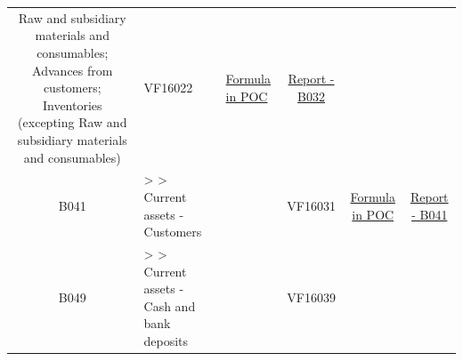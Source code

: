 \documentclass[]{book}
\begin{document}
\begin{longtable}[]{@{}cllccc@{}}
\begin{minipage}[t]{0.16\columnwidth}
Raw and subsidiary materials and consumables; Advances from customers; Inventories (excepting Raw and subsidiary materials and consumables)\strut
\end{minipage} & \begin{minipage}[t]{0.09\columnwidth}\centering
VF16022\strut
\end{minipage} & \begin{minipage}[t]{0.15\columnwidth}\centering
\protect\hyperlink{b032---formula-in-poc}{Formula in POC}\strut
\end{minipage} & \begin{minipage}[t]{0.16\columnwidth}\centering
\href{./Auxiliary\%20Files/technical_reports/variable_report/B032(!).pdf}{Report - B032}\strut
\end{minipage}\tabularnewline
\begin{minipage}[t]{0.08\columnwidth}\centering
B041\strut
\end{minipage} & \begin{minipage}[t]{0.20\columnwidth}\raggedright
\textgreater{} \textgreater{} Current assets - Customers\strut
\end{minipage} & \begin{minipage}[t]{0.16\columnwidth}\raggedright
\strut
\end{minipage} & \begin{minipage}[t]{0.09\columnwidth}\centering
VF16031\strut
\end{minipage} & \begin{minipage}[t]{0.15\columnwidth}\centering
\protect\hyperlink{b041---formula-in-poc}{Formula in POC}\strut
\end{minipage} & \begin{minipage}[t]{0.16\columnwidth}\centering
\href{./Auxiliary\%20Files/technical_reports/variable_report/B041(!).pdf}{Report - B041}\strut
\end{minipage}\tabularnewline
\begin{minipage}[t]{0.08\columnwidth}\centering
B049\strut
\end{minipage} & \begin{minipage}[t]{0.20\columnwidth}\raggedright
\textgreater{} \textgreater{} Current assets - Cash and bank deposits\strut
\end{minipage} & \begin{minipage}[t]{0.16\columnwidth}\raggedright
\strut
\end{minipage} & \begin{minipage}[t]{0.09\columnwidth}\centering
VF16039\strut

\end{minipage}
\end{longtable}
\end{document}
